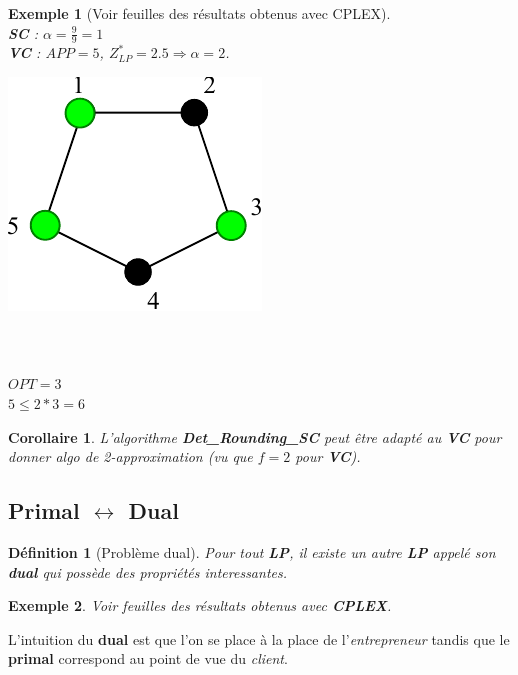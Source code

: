 \documentclass{article}
\newcommand{\titre}[1]{\textcolor{title}{#1}}
\newtheorem{de}{D\'efinition}[section]
\newtheorem{exemple}{Exemple}[section]
\newtheorem{corollaire}{Corollaire}[section]
\begin{document}
\begin{sffamily}
\begin{exemple}[Voir feuilles des résultats obtenus avec CPLEX]$ $\\
\textbf{\titre{SC}} : $\alpha = \frac{9}{9} = 1$ \\
\textbf{\titre{VC}} : $APP = 5$, $Z^*_{LP} = 2.5 \Rightarrow \alpha = 2$. \\
\begin{multicols}{2}
\includegraphics[scale=1]{vcSol.pdf}
$ $\\$ $\\$ $\\$ $\\
$OPT = 3$\\
$5 \leq 2*3=6$
\end{multicols}
\end{exemple}

\begin{corollaire}
L'algorithme \textbf{Det\_Rounding\_SC} peut être adapté au \textbf{\titre{VC}} pour donner algo de 2-approximation (vu que $f = 2$ pour 
\textbf{\titre{VC}}).
\end{corollaire}

\subsection{Primal $\leftrightarrow$ Dual}

\begin{de}[Problème dual]
Pour tout \textbf{\titre{LP}}, il existe un autre \textbf{\titre{LP}} appelé son \textbf{dual} qui possède des propriétés interessantes.
\end{de}

\begin{exemple}Voir feuilles des résultats obtenus avec \textbf{CPLEX}.\end{exemple}

L'intuition du \textbf{dual} est que l'on se place à la place de l'\textit{entrepreneur} tandis que le \textbf{primal} correspond au 
point de vue du \textit{client}. \\


\end{sffamily}
\end{document}
